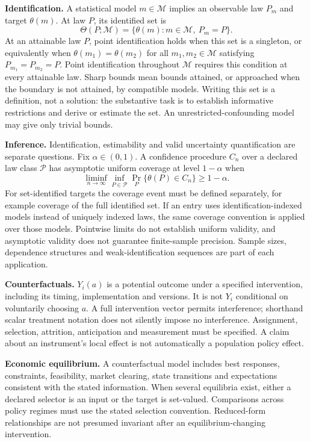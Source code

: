 \documentclass[11pt,a4paper]{article}
\begin{document}
\textbf{Identification.} A statistical model $m\in\mathcal M$ implies an observable law $P_m$ and target $\theta(m)$. At law $P$, its identified set is
\[
\Theta(P;\mathcal M)=\{\theta(m):m\in\mathcal M,\ P_m=P\}.
\]
At an attainable law $P$, point identification holds when this set is a singleton, or equivalently when $\theta(m_1)=\theta(m_2)$ for all $m_1,m_2\in\mathcal M$ satisfying $P_{m_1}=P_{m_2}=P$. Point identification throughout $\mathcal M$ requires this condition at every attainable law. Sharp bounds mean bounds attained, or approached when the boundary is not attained, by compatible models. Writing this set is a definition, not a solution: the substantive task is to establish informative restrictions and derive or estimate the set. An unrestricted-confounding model may give only trivial bounds.

\textbf{Inference.} Identification, estimability and valid uncertainty quantification are separate questions. Fix $\alpha\in(0,1)$. A confidence procedure $C_n$ over a declared law class $\mathcal P$ has asymptotic uniform coverage at level $1-\alpha$ when
\[
\liminf_{n\to\infty}\inf_{P\in\mathcal P}\Pr_P\{\theta(P)\in C_n\}\geq1-\alpha.
\]
For set-identified targets the coverage event must be defined separately, for example coverage of the full identified set. If an entry uses identification-indexed models instead of uniquely indexed laws, the same coverage convention is applied over those models. Pointwise limits do not establish uniform validity, and asymptotic validity does not guarantee finite-sample precision. Sample sizes, dependence structures and weak-identification sequences are part of each application.

\textbf{Counterfactuals.} $Y_i(a)$ is a potential outcome under a specified intervention, including its timing, implementation and versions. It is not $Y_i$ conditional on voluntarily choosing $a$. A full intervention vector permits interference; shorthand scalar treatment notation does not silently impose no interference. Assignment, selection, attrition, anticipation and measurement must be specified. A claim about an instrument's local effect is not automatically a population policy effect.

\textbf{Economic equilibrium.} A counterfactual model includes best responses, constraints, feasibility, market clearing, state transitions and expectations consistent with the stated information. When several equilibria exist, either a declared selector is an input or the target is set-valued. Comparisons across policy regimes must use the stated selection convention. Reduced-form relationships are not presumed invariant after an equilibrium-changing intervention.
\end{document}
